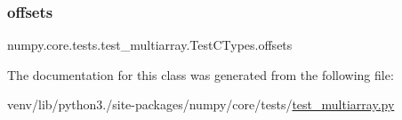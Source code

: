\subsubsection{\texorpdfstring{offsets}{offsets}}
{\footnotesize\ttfamily numpy.\+core.\+tests.\+test\+\_\+multiarray.\+Test\+C\+Types.\+offsets\hspace{0.3cm}{\ttfamily [static]}}



The documentation for this class was generated from the following file\+:\begin{DoxyCompactItemize}
\item 
venv/lib/python3./site-\/packages/numpy/core/tests/\hyperlink{core_2tests_2test__multiarray_8py}{test\+\_\+multiarray.\+py}\end{DoxyCompactItemize}
